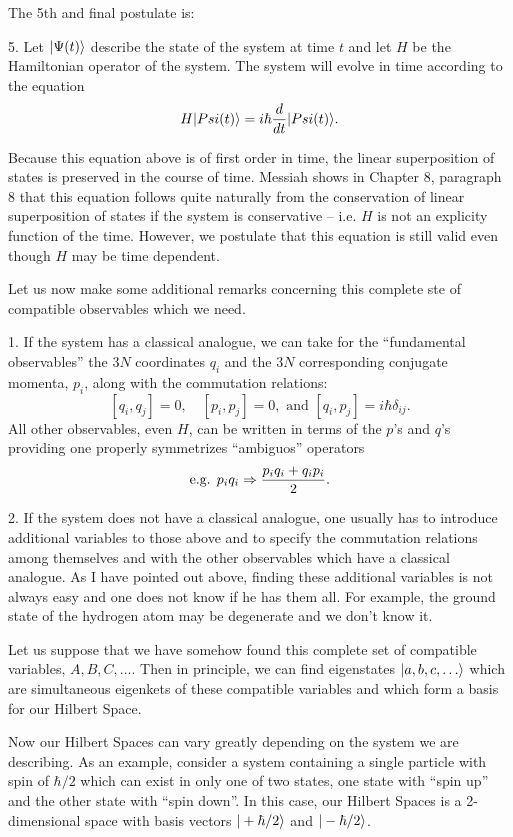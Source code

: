The 5th and final postulate is: 
\begin{postulate}5. Let $|\Psi(t)\rangle$ describe the state of the system at time $t$ and let $H$ be the Hamiltonian operator of the system. The system will evolve in time according to the equation
$$H|Psi(t)\rangle = i\hbar{d\over dt} |Psi(t)\rangle.$$
\end{postulate}
Because this equation above is of first order in time, the linear superposition of states is preserved in the course of time. Messiah shows in Chapter 8, paragraph 8 that this equation follows quite naturally from the 
conservation of linear superposition of states if the system is conservative -- i.e. $H$ is not an explicity function of the time. However, we postulate that this equation is still valid even though $H$ may be time dependent. 

Let us now make some additional remarks concerning this complete ste of compatible observables which we need. 

1. If the system has a classical analogue, we can take for the ``fundamental observables''
the $3N$ coordinates $q_i$ and the $3N$ corresponding conjugate momenta, $p_i$, along with the commutation relations:
$$[q_i,q_j] = 0, \quad [p_i,p_j] = 0, \mbox{ and } [q_i,p_j] = i\hbar\delta_{ij}.$$
All other observables, even $H$, can be written in terms of the $p$'s and $q$'s providing one properly symmetrizes ``ambiguos'' operators 
$$\mbox{e.g. } p_i q_i \Rightarrow {p_iq_i + q_ip_i\over 2}.$$

2. If the system does not have a classical analogue, one usually has to introduce additional variables to those above and to specify the commutation relations among themselves and with the other observables which have a 
classical analogue. As I have pointed out above, finding these additional variables is not always easy and one does not know if he has them all. For example, the ground state of the hydrogen atom may be degenerate and 
we don't know it. 

Let us suppose that we have somehow found this complete set of compatible variables, $A, B, C, \hdots$. Then in principle, we can find eigenstates $|a,b,c,\hdots\rangle$ which are simultaneous 
eigenkets of these compatible variables and which form a basis for our Hilbert Space. 

Now our Hilbert Spaces can vary greatly depending on the system we are describing. As an example, consider a system containing a single particle with spin of $\hbar/2$ which can exist in only one of two states, one state
with ``spin up'' and the other state with ``spin down''. In this case, our Hilbert Spaces is a 2-dimensional space with basis vectors $|+\hbar/2\rangle$ and $|-\hbar/2\rangle$.

